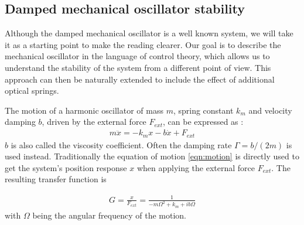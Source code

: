 
\subsection{Damped mechanical oscillator stability}

Although the damped mechanical oscillator is a well known system, we will take it as a starting point to make the reading clearer. Our goal is to describe the mechanical oscillator in the language of control theory, which allows us to understand the stability of the system from a different point of view. This approach can then be naturally extended to include the effect of additional optical springs. 

The motion of a harmonic oscillator of mass $m$, spring constant $k_m$ and velocity damping $b$, driven by the external force $F_{ext}$, can be expressed as \cite{Saulson90}:
\begin{eqnarray}
\label{eqn:motion}
m\ddot{x}=-k_m x-b\dot{x}+F_{ext}
\end{eqnarray}
$b$ is also called the viscosity coefficient. Often the damping rate $\Gamma=b/(2 m)$ is used instead.
Traditionally the equation of motion \ref{eqn:motion} is directly used to get the system's position response $x$ when applying the external force $F_{ext}$. The resulting transfer function is

\begin{eqnarray}
\label{eqn:TF}
G=\frac{x}{F_{ext}}=\frac{1}{-m\Omega^2+k_m+ib\Omega}                                                 %
\end{eqnarray}
with $\Omega$ being the angular frequency of the motion.

